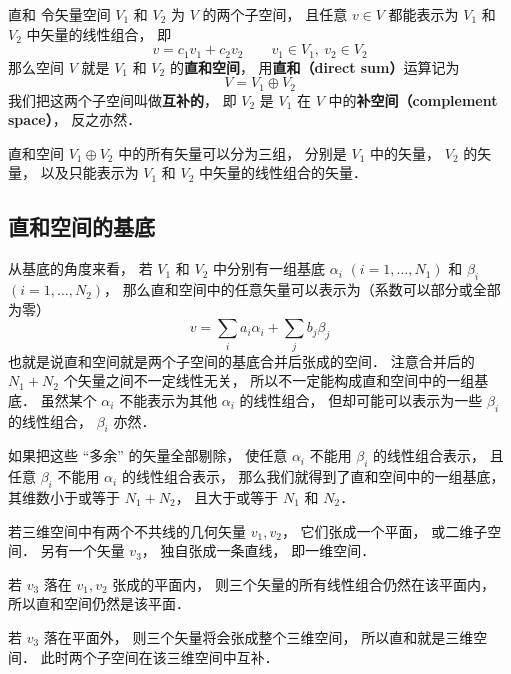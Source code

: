 
\begin{definition}{直和}\label{DirSum_def1}
令矢量空间 $V_1$ 和 $V_2$ 为 $V$ 的两个子空间， 且任意 ${v} \in V$ 都能表示为 $V_1$ 和 $V_2$ 中矢量的线性组合， 即
\begin{equation}
{v} = c_1 {v_1} + c_2 {v_2}
\qquad
{v_1} \in V_1,\ {v_2} \in V_2
\end{equation}
那么空间 $V$ 就是 $V_1$ 和 $V_2$ 的\textbf{直和空间}， 用\textbf{直和（direct sum）}运算记为
\begin{equation}
V = V_1 \oplus V_2
\end{equation}
我们把这两个子空间叫做\textbf{互补的}， 即 $V_2$ 是 $V_1$ 在 $V$ 中的\textbf{补空间（complement space）}， 反之亦然．
\end{definition}

直和空间 $V_1 \oplus V_2$ 中的所有矢量可以分为三组， 分别是 $V_1$ 中的矢量， $V_2$ 的矢量， 以及只能表示为 $V_1$ 和 $V_2$ 中矢量的线性组合的矢量．

\subsection{直和空间的基底}
从基底的角度来看， 若 $V_1$ 和 $V_2$ 中分别有一组基底 ${\alpha_i}$ $(i = 1, \dots, N_1)$ 和 ${\beta_i}$ $(i = 1, \dots, N_2)$， 那么直和空间中的任意矢量可以表示为（系数可以部分或全部为零）
\begin{equation}
{v} = \sum_i a_i {\alpha_i} + \sum_j b_j {\beta_j}
\end{equation}
也就是说直和空间就是两个子空间的基底合并后张成的空间． 注意合并后的 $N_1 + N_2$ 个矢量之间不一定线性无关， 所以不一定能构成直和空间中的一组基底． 虽然某个 ${\alpha_i}$ 不能表示为其他 ${\alpha_i}$ 的线性组合， 但却可能可以表示为一些 ${\beta_i}$ 的线性组合， ${\beta_i}$ 亦然．

如果把这些 “多余” 的矢量全部剔除， 使任意 ${\alpha_i}$ 不能用 ${\beta_i}$ 的线性组合表示， 且任意 ${\beta_i}$ 不能用 ${\alpha_i}$ 的线性组合表示， 那么我们就得到了直和空间中的一组基底， 其维数小于或等于 $N_1 + N_2$， 且大于或等于 $N_1$ 和 $N_2$．

\begin{example}{}\label{DirSum_ex1}
若三维空间中有两个不共线的几何矢量 ${v_1}, {v_2}$， 它们张成一个平面， 或二维子空间． 另有一个矢量 ${v_3}$， 独自张成一条直线， 即一维空间．

若 ${v_3}$ 落在 ${v_1}, {v_2}$ 张成的平面内， 则三个矢量的所有线性组合仍然在该平面内， 所以直和空间仍然是该平面．

若 ${v_3}$ 落在平面外， 则三个矢量将会张成整个三维空间， 所以直和就是三维空间． 此时两个子空间在该三维空间中互补．
\end{example}

